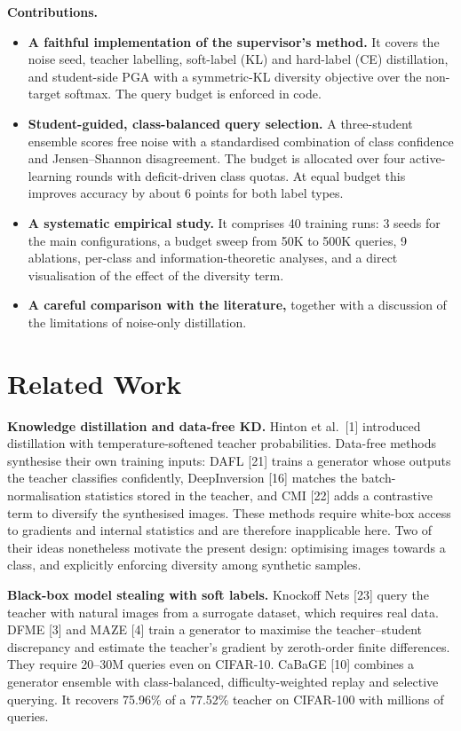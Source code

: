 \documentclass[
  10pt,
]{article}
\providecommand{\tightlist}{%
  \setlength{\itemsep}{0pt}\setlength{\parskip}{0pt}}
\begin{document}
\textbf{Contributions.}

\begin{itemize}
\tightlist
\item
  \textbf{A faithful implementation of the supervisor's method.} It
  covers the noise seed, teacher labelling, soft-label (KL) and
  hard-label (CE) distillation, and student-side PGA with a symmetric-KL
  diversity objective over the non-target softmax. The query budget is
  enforced in code.
\item
  \textbf{Student-guided, class-balanced query selection.} A
  three-student ensemble scores free noise with a standardised
  combination of class confidence and Jensen--Shannon disagreement. The
  budget is allocated over four active-learning rounds with
  deficit-driven class quotas. At equal budget this improves accuracy by
  about 6 points for both label types.
\item
  \textbf{A systematic empirical study.} It comprises 40 training runs:
  3 seeds for the main configurations, a budget sweep from 50K to 500K
  queries, 9 ablations, per-class and information-theoretic analyses,
  and a direct visualisation of the effect of the diversity term.
\item
  \textbf{A careful comparison with the literature,} together with a
  discussion of the limitations of noise-only distillation.
\end{itemize}

\hypertarget{related-work}{%
\section{Related Work}\label{related-work}}

\textbf{Knowledge distillation and data-free KD.} Hinton et al.~{[}1{]}
introduced distillation with temperature-softened teacher probabilities.
Data-free methods synthesise their own training inputs: DAFL {[}21{]}
trains a generator whose outputs the teacher classifies confidently,
DeepInversion {[}16{]} matches the batch-normalisation statistics stored
in the teacher, and CMI {[}22{]} adds a contrastive term to diversify
the synthesised images. These methods require white-box access to
gradients and internal statistics and are therefore inapplicable here.
Two of their ideas nonetheless motivate the present design: optimising
images towards a class, and explicitly enforcing diversity among
synthetic samples.

\textbf{Black-box model stealing with soft labels.} Knockoff Nets
{[}23{]} query the teacher with natural images from a surrogate dataset,
which requires real data. DFME {[}3{]} and MAZE {[}4{]} train a
generator to maximise the teacher--student discrepancy and estimate the
teacher's gradient by zeroth-order finite differences. They require
20--30M queries even on CIFAR-10. CaBaGE {[}10{]} combines a generator
ensemble with class-balanced, difficulty-weighted replay and selective
querying. It recovers 75.96\% of a 77.52\% teacher on CIFAR-100 with
millions of queries.
\end{document}
